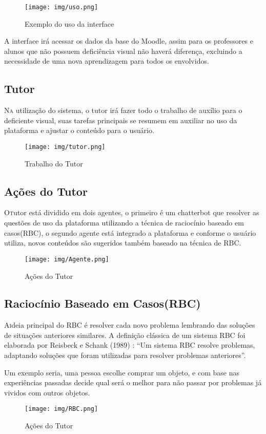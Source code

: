 \begin{figure}[htbp!]
\centering
\texttt{[image: img/uso.png]}
\caption{Exemplo do uso da interface}
\label{fig:uso}
\end{figure}

A interface irá acessar os dados da base do Moodle, assim para os professores e alunos que não possuem deficiência visual não haverá diferença, excluindo a necessidade de uma nova aprendizagem para todos os envolvidos.

\subsection{Tutor}
\lettrine{N}{a} utilização do sistema, o tutor irá fazer todo o trabalho de auxílio para o deficiente visual, suas tarefas principais se resumem em auxiliar no uso da plataforma e ajustar o conteúdo para o usuário.

\begin{figure}[htbp!]
\centering
\texttt{[image: img/tutor.png]}
\caption{Trabalho do Tutor}
\label{fig:tutor}
\end{figure}

\subsection{Ações do Tutor}
\lettrine{O} tutor está dividido em dois agentes, o primeiro é um chatterbot que resolver as questões de uso da plataforma utilizando a técnica de raciocínio baseado em casos(RBC), o segundo agente está integrado a plataforma e conforme o usuário utiliza, novos conteúdos são sugeridos também baseado na técnica de RBC.

\begin{figure}[htbp!]
\centering
\texttt{[image: img/Agente.png]}
\caption{Ações do Tutor}
\label{fig:agente}
\end{figure}

\subsection{Raciocínio Baseado em Casos(RBC)}
\lettrine{A} ideia principal do RBC é resolver cada novo problema lembrando das soluções de situações anteriores similares. A definição clássica de um sistema RBC foi elaborada por Reisbeck e Schank (1989) \citep{Riesbeck}: “Um sistema RBC resolve problemas, adaptando soluções que foram utilizadas para resolver problemas anteriores”.

Um exemplo seria, uma pessoa escolhe comprar um objeto, e com base nas experiências passadas decide qual será o melhor para não passar por problemas já vividos com outros objetos.

\begin{figure}[htbp!]
\centering
\texttt{[image: img/RBC.png]}
\caption{Ações do Tutor}
\label{fig:Ciclo RBC}
\end{figure}
